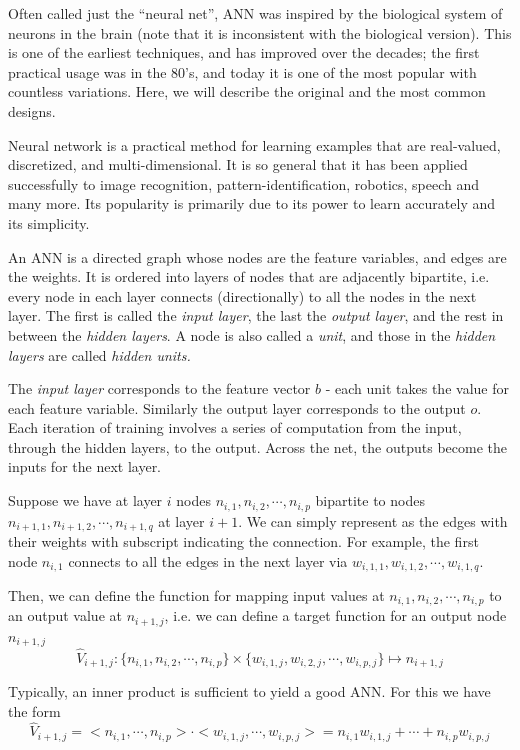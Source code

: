 \documentclass[12pt]{article}  %
\begin{document}
Often called just the ``neural net'', ANN was inspired by the biological system of neurons in the brain (note that it is inconsistent with the biological version). This is one of the earliest techniques, and has improved over the decades; the first practical usage was in the 80's, and today it is one of the most popular with countless variations. Here, we will describe the original and the most common designs.

Neural network is a practical method for learning examples that are real-valued, discretized, and multi-dimensional. It is so general that it has been applied successfully to image recognition, pattern-identification, robotics, speech and many more. Its popularity is primarily due to its power to learn accurately and its simplicity.

An ANN is a directed graph whose nodes are the feature variables, and edges are the weights. It is ordered into layers of nodes that are adjacently bipartite, i.e. every node in each layer connects (directionally) to all the nodes in the next layer. The first is called the {\em input layer}, the last the {\em output layer}, and the rest in between the {\em hidden layers}. A node is also called a {\em unit}, and those in the {\em hidden layers} are called {\em hidden units.}

The {\em input layer} corresponds to the feature vector $b$ - each unit takes the value for each feature variable. Similarly the output layer corresponds to the output $o$. Each iteration of training involves a series of computation from the input, through the hidden layers, to the output. Across the net, the outputs become the inputs for the next layer.

Suppose we have at layer $i$ nodes $n_{i,1}, n_{i,2}, \cdots, n_{i,p}$ bipartite to nodes $n_{i+1,1}, n_{i+1,2}, \cdots, n_{i+1,q}$ at layer $i+1$. We can simply represent as the edges with their weights with subscript indicating the connection. For example, the first node $n_{i,1}$ connects to all the edges in the next layer via $w_{i,1,1}, w_{i,1,2}, \cdots, w_{i,1,q}$.

Then, we can define the function for mapping input values at $n_{i,1}, n_{i,2}, \cdots, n_{i,p}$ to an output value at $n_{i+1,j}$, i.e. we can define a target function for an output node $n_{i+1,j}$ $$\hat{V}_{i+1,j} : \{ n_{i,1}, n_{i,2}, \cdots, n_{i,p} \} \times \{ w_{i,1,j}, w_{i,2,j}, \cdots, w_{i,p,j} \} \mapsto n_{i+1,j}$$

Typically, an inner product is sufficient to yield a good ANN. For this we have the form $$\hat{V}_{i+1,j} = < n_{i,1}, \cdots, n_{i,p} > \cdot < w_{i,1,j}, \cdots, w_{i,p,j} > = n_{i,1}w_{i,1,j} + \cdots + n_{i,p}w_{i,p,j}$$
\end{document}
